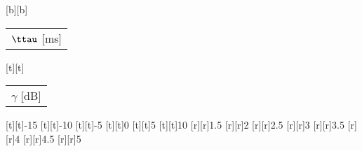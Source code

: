 %    
%
%
%
[b][b]{\fontsize{9}{13.5}\selectfont \color[rgb]{0,0,0}\setlength{\tabcolsep}{0pt}\begin{tabular}{c}$\ttau$ [ms]\end{tabular}}%
[t][t]{\fontsize{9}{13.5}\selectfont \color[rgb]{0,0,0}\setlength{\tabcolsep}{0pt}\begin{tabular}{c}$\gamma$ [dB]\end{tabular}}%
%
\fontsize{9}{13.5}%
\selectfont%
%
[t][t]{-15}%
[t][t]{-10}%
[t][t]{-5}%
[t][t]{0}%
[t][t]{5}%
[t][t]{10}%
%
[r][r]{1.5}%
[r][r]{2}%
[r][r]{2.5}%
[r][r]{3}%
[r][r]{3.5}%
[r][r]{4}%
[r][r]{4.5}%
[r][r]{5}%
%
%
